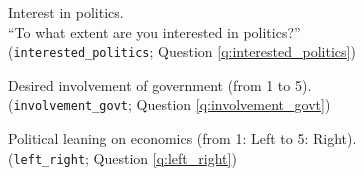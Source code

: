 \begin{figure}[h!] 
    \cprotect\caption[Interest in politics]{Interest in politics. \\ ``To what extent are you interested in politics?'' (\verb|interested_politics|; Question \ref{q:interested_politics})}\label{fig:interested_politics}
\end{figure}

\begin{figure}[h!] 
    \cprotect\caption[Desired involvement of government]{Desired involvement of government (from 1 to 5). (\verb|involvement_govt|; Question \ref{q:involvement_govt})}\label{fig:involvement_govt}
\end{figure}

\begin{figure}[h!] 
    \cprotect\caption[Political leaning]{Political leaning on economics (from 1: Left to 5: Right). (\verb|left_right|; Question \ref{q:left_right})}\label{fig:left_right}
\end{figure}

